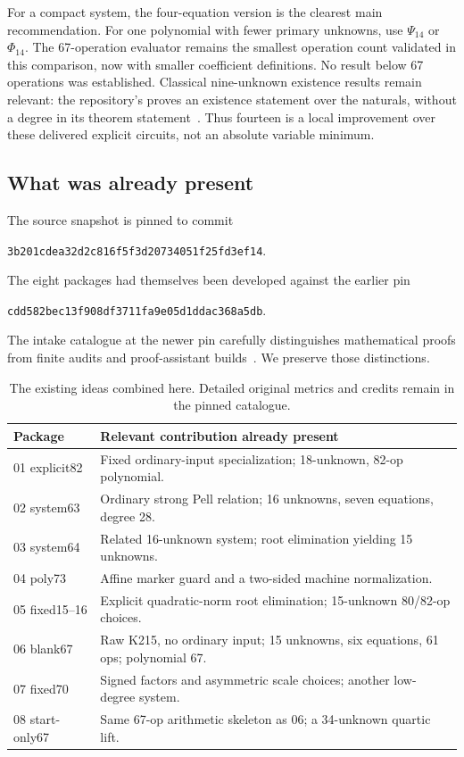 \documentclass[11pt,a4paper]{article}
\theoremstyle{remark}\newtheorem{remark}[theorem]{Remark}
\newcommand{\src}[1]{{\small\path{#1}}}
\begin{document}
For a compact system, the four-equation version is the clearest main
recommendation. For one polynomial with fewer primary unknowns, use
\(\Psi_{14}\) or \(\Phi_{14}\). The 67-operation evaluator remains the
smallest operation count validated in this comparison, now with smaller
coefficient definitions. No result below 67 operations was established.
Classical nine-unknown existence results remain relevant: the repository's
\src{Jones1982.nine_unknowns} proves an existence statement over the naturals,
without a degree in its theorem statement~\cite{nine,jones}. Thus fourteen
is a local improvement over these delivered explicit circuits, not an
absolute variable minimum.

\subsection{What was already present}

The source snapshot is pinned to commit
\begin{center}\small\texttt{3b201cdea32d2c816f5f3d20734051f25fd3ef14}.\end{center}
The eight packages had themselves been developed against the earlier pin
\begin{center}\small\texttt{cdd582bec13f908df3711fa9e05d1ddac368a5db}.\end{center}
The intake catalogue
at the newer pin carefully distinguishes mathematical proofs from finite
audits and proof-assistant builds~\cite{catalogue}. We preserve those
distinctions.

\begin{table}[ht]
\centering\small
\begin{tabular}{@{}lp{75mm}@{}}
\toprule
Package & Relevant contribution already present\\
\midrule
01 explicit82 & Fixed ordinary-input specialization; 18-unknown, 82-op polynomial.\\
02 system63 & Ordinary strong Pell relation; 16 unknowns, seven equations, degree 28.\\
03 system64 & Related 16-unknown system; root elimination yielding 15 unknowns.\\
04 poly73 & Affine marker guard and a two-sided machine normalization.\\
05 fixed15--16 & Explicit quadratic-norm root elimination; 15-unknown 80/82-op choices.\\
06 blank67 & Raw K215, no ordinary input; 15 unknowns, six equations, 61 ops; polynomial 67.\\
07 fixed70 & Signed factors and asymmetric scale choices; another low-degree system.\\
08 start-only67 & Same 67-op arithmetic skeleton as 06; a 34-unknown quartic lift.\\
\bottomrule
\end{tabular}
\caption{The existing ideas combined here. Detailed original metrics and
credits remain in the pinned catalogue.}
\end{table}
\end{document}
